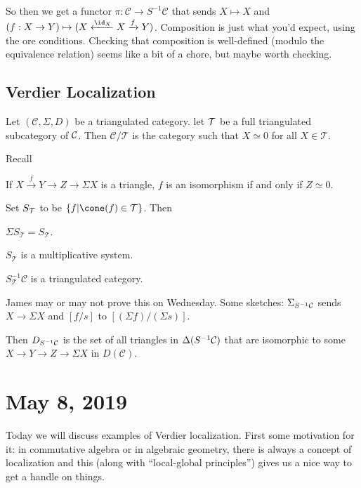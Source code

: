 \documentclass[12pt]{article}
\begin{document}
So then we get a functor $\pi:\mathcal{C}\to S^{-1}\mathcal{C}$ that sends $X\mapsto X$ and $(f:X\to Y)\mapsto (X\xleftarrow{\id_X}X\xrightarrow{f}Y)$.
Composition is just what you'd expect, using the ore conditions. Checking that composition is well-defined (modulo the equivalence relation)
seems like a bit of a chore, but maybe worth checking.

\subsection{Verdier Localization}
Let $(\mathcal{C}, \Sigma, D)$ be a triangulated category. let $\cal T$ be a full triangulated subcategory of $\cal C$.
Then $\mathcal{C}/\mathcal{T}$ is the category such that $X\simeq 0$ for all $X\in\mathcal{T}$.

Recall
\begin{prop}
	If $X\xrightarrow{f} Y\to Z\to\Sigma X$ is a triangle, $f$ is an isomorphism if and only if $Z\simeq 0$.
\end{prop}

Set $S_{\cal T}$ to be $\{f|\cone(f)\in\mathcal{T}\}$. Then 
\begin{lem}
	$\Sigma S_{\mathcal{T}}=S_{\mathcal{T}}$.
\end{lem}
\begin{lem}
	$S_{\mathcal{T}}$ is a multiplicative system.
\end{lem}
\begin{thm}
	$S_{\mathcal{T}}^{-1}\mathcal{C}$ is a triangulated category.
\end{thm}
\begin{rmk}
	James may or may not prove this on Wednesday. Some sketches: $\Sigma_{S^{-1}\cal C}$ sends $X\to\Sigma X$ and $[f/s]$ to $[(\Sigma f)/(\Sigma s)]$.

	Then $D_{S^{-1}\cal C}$ is the set of all triangles in $\Delta(S^{-1}\cal C)$ that are isomorphic to some $X\to Y\to Z\to\Sigma X$ in $D(\mathcal{C})$.
\end{rmk}

\section{May 8, 2019}
Today we will discuss examples of Verdier localization. First some motivation for it: in commutative algebra or in algebraic 
geometry, there is always a concept of localization and this (along with ``local-global principles'') gives us a nice 
way to get a handle on things.
\end{document}
